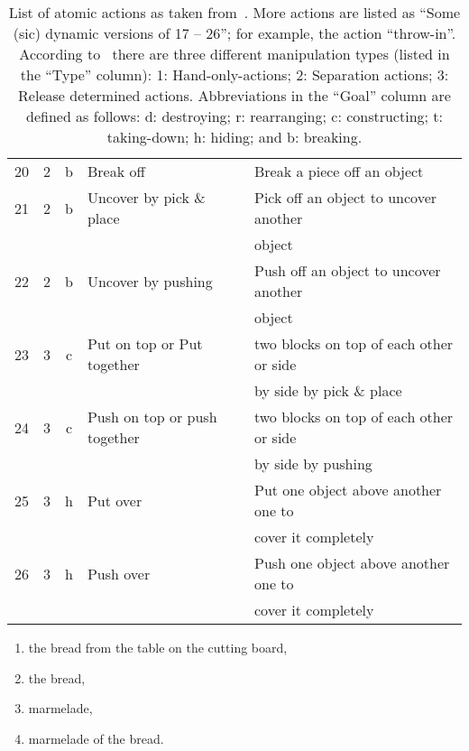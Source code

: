 \begin{table}[]
{\begin{tabular}{cccll}
    20  & 2 & b     & Break off         & Break a piece off an object\\
    21  & 2 & b     & Uncover by pick \& place    & Pick off an object to uncover another\\
        &   &       &                           & object\\
    22  & 2 & b     & Uncover by pushing        & Push off an object to uncover another\\
        &   &       &                           & object\\
    \midrule
    23  & 3 & c     & Put on top or Put together    & two blocks on top of each other or side\\
        &   &       &                               & by side by pick \& place\\
    24  & 3 & c     & Push on top or push together  & two blocks on top of each other or side\\
        &   &       &                               & by side by pushing\\
    25  & 3 & h     & Put over          & Put one object above another one to\\
        &   &       &                   & cover it completely\\
    26  & 3 & h     & Push over         & Push one object above another one to\\
        &   &       &                   & cover it completely\\
    \bottomrule
  \end{tabular}
}
  \caption{List of atomic actions as taken from~\cite{worgotter2013simple}. 
      More actions are listed as ``Some (sic) dynamic versions of 17 -- 26''; for example, the action ``throw-in''.
      According to~\cite{worgotter2013simple} there are three different manipulation types (listed in the ``Type'' column): 1: Hand-only-actions; 2: Separation actions; 3: Release determined actions.
      Abbreviations in the ``Goal'' column are defined as follows: d: destroying; r: rearranging; c: constructing; t: taking-down; h: hiding; and b: breaking.}
  \label{tab:sec_definitionofactions_actiontable}
\end{table}

\begin{enumerate}
  \item {} the bread from the table on the cutting board,
  \item {} the bread,
  \item {} marmelade,
  \item {} marmelade  of the bread.
\end{enumerate}

